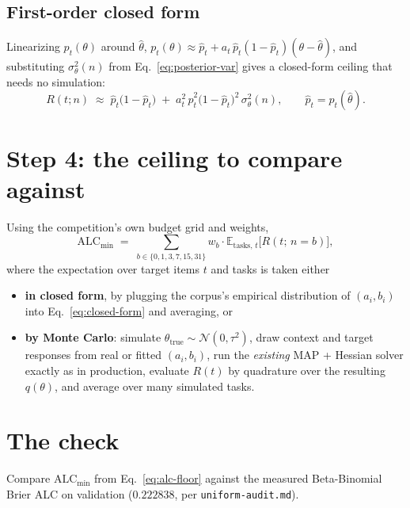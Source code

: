 \documentclass[11pt]{article}
\begin{document}
\subsection{First-order closed form}

Linearizing $p_t(\theta)$ around $\hat\theta$,
$p_t(\theta) \approx \hat p_t + a_t\, \hat p_t(1-\hat p_t)(\theta - \hat\theta)$,
and substituting $\sigma_\theta^2(n)$ from Eq.~\eqref{eq:posterior-var} gives
a closed-form ceiling that needs no simulation:
\begin{equation}
  R(t; n) \;\approx\;
  \hat p_t \big(1 - \hat p_t\big)
  \;+\;
  a_t^2\, \hat p_t^2 \big(1 - \hat p_t\big)^2\, \sigma_\theta^2(n),
  \qquad \hat p_t = p_t(\hat\theta).
  \label{eq:closed-form}
\end{equation}

\section{Step 4: the ceiling to compare against}

Using the competition's own budget grid and weights,
\begin{equation}
  \mathrm{ALC}_{\min} \;=\; \sum_{b \in \{0,1,3,7,15,31\}} w_b \cdot
  \mathbb{E}_{\text{tasks},\, t}\big[R(t;\, n=b)\big],
  \label{eq:alc-floor}
\end{equation}
where the expectation over target items $t$ and tasks is taken either

\begin{itemize}
  \item \textbf{in closed form}, by plugging the corpus's empirical
    distribution of $(a_i, b_i)$ into Eq.~\eqref{eq:closed-form} and
    averaging, or
  \item \textbf{by Monte Carlo}: simulate $\theta_{\mathrm{true}} \sim
    \mathcal{N}(0, \tau^2)$, draw context and target responses from real or
    fitted $(a_i, b_i)$, run the \emph{existing} MAP + Hessian solver
    exactly as in production, evaluate $R(t)$ by quadrature over the
    resulting $q(\theta)$, and average over many simulated tasks.
\end{itemize}

\section{The check}

Compare $\mathrm{ALC}_{\min}$ from Eq.~\eqref{eq:alc-floor} against the
measured Beta-Binomial Brier ALC on validation ($0.222838$, per
\texttt{uniform-audit.md}).
\end{document}
